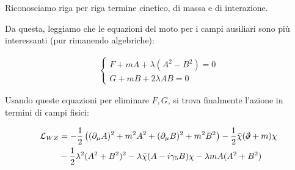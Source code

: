 \documentclass{report}
\begin{document}
Riconosciamo riga per riga termine cinetico, di massa e di interazione. 

Da questa, leggiamo che le equazioni del moto per i campi ausiliari sono più interessanti (pur rimanendo algebriche): 

\begin{align}
    \begin{cases}
        F + mA +\lambda(A^2 - B^2) = 0 \\ G + mB + 2\lambda AB = 0 
    \end{cases}
\end{align}

Usando queste equazioni per eliminare \(F, G\), si trova finalmente l'azione in termini di campi fisici: 

\begin{align}
    \mathcal{L}_{WZ} &= -\frac{1}{2}\left((\partial_\mu A)^2 + m^2 A^2 + (\partial_\mu B)^2 + m^2B^2\right) - \frac{1}{2}\bar{\chi}(\slashed{\partial}+m)\chi \notag \\
    &-\frac{1}{2}\lambda^2(A^2 + B^2)^2 - \lambda \bar{\chi}(A-i\gamma_5 B)\chi - \lambda m A (A^2 + B^2)
\end{align}

\end{document}
